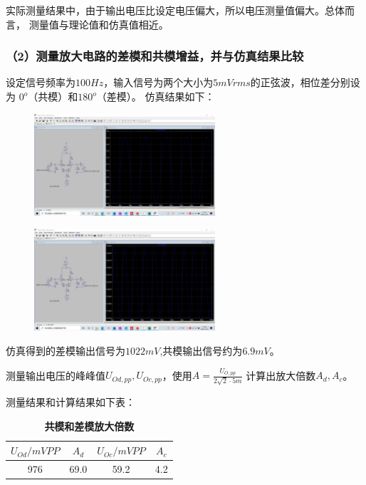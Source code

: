 \documentclass[UTF8]{ctexart}
\begin{document}
实际测量结果中，由于输出电压比设定电压偏大，所以电压测量值偏大。总体而言，
测量值与理论值和仿真值相近。

\subsubsection*{（2）测量放大电路的差模和共模增益，并与仿真结果比较}

设定信号频率为$100Hz$，输入信号为两个大小为$5mVrms$的正弦波，相位差分别设为
$0^o$（共模）和$180^o$（差模）。
仿真结果如下：
\begin{figure}[htbp]
    \centering
    \includegraphics[width=0.60\textwidth]{1-2-差模.jpg}
\end{figure}

\begin{figure}[htbp]
    \centering
    \includegraphics[width=0.60\textwidth]{1-3-共模.jpg}
\end{figure}

仿真得到的差模输出信号为$1022mV$,共模输出信号约为$6.9mV$。

测量输出电压的峰峰值$U_{Od,pp},U_{Oc,pp}$，使用$A = \frac{U_{O,pp}}{2\sqrt{2} \cdot 5m}$
计算出放大倍数$A_d, A_c$。

测量结果和计算结果如下表：

\begin{table}[H]
    \centering
    \caption{\label{表2}\textbf{共模和差模放大倍数}}
    \begin{tabular}{cccc}
    \toprule
        $U_{Od}/mVPP$ & $A_d$ & $U_{Oc}/mVPP$ & $A_c$\\
    \midrule
        976 & 69.0 & 59.2 & 4.2 \\
    \bottomrule
    \end{tabular}
\end{table}
\end{document}
